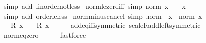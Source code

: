 \begin{isabellebody}
%
\isatagproof
{}\isamarkupfalse%
\ {\isacharparenleft}{\kern0pt}simp\ add{\isacharcolon}{\kern0pt}\ linorder{\isacharunderscore}{\kern0pt}not{\isacharunderscore}{\kern0pt}less{\isacharparenright}{\kern0pt}%
\endisatagproof
{\isafoldproof}%
%
\isadelimproof
\isanewline
%
\endisadelimproof
\isanewline
{}\isamarkupfalse%
\ norm{\isacharunderscore}{\kern0pt}le{\isacharunderscore}{\kern0pt}zero{\isacharunderscore}{\kern0pt}iff\ {\isacharbrackleft}{\kern0pt}simp{\isacharbrackright}{\kern0pt}{\isacharcolon}{\kern0pt}\ {\isachardoublequoteopen}norm\ x\ {\isasymle}\ {}\ {\isasymlongleftrightarrow}\ x\ {\isacharequal}{\kern0pt}\ {}{\isachardoublequoteclose}\isanewline
%
\isadelimproof
\ \ %
\endisadelimproof
%
\isatagproof
{}\isamarkupfalse%
\ {\isacharparenleft}{\kern0pt}simp\ add{\isacharcolon}{\kern0pt}\ order{\isacharunderscore}{\kern0pt}le{\isacharunderscore}{\kern0pt}less{\isacharparenright}{\kern0pt}%
\endisatagproof
{\isafoldproof}%
%
\isadelimproof
\isanewline
%
\endisadelimproof
\isanewline
{}\isamarkupfalse%
\ norm{\isacharunderscore}{\kern0pt}minus{\isacharunderscore}{\kern0pt}cancel\ {\isacharbrackleft}{\kern0pt}simp{\isacharbrackright}{\kern0pt}{\isacharcolon}{\kern0pt}\ {\isachardoublequoteopen}norm\ {\isacharparenleft}{\kern0pt}{\isacharminus}{\kern0pt}\ x{\isacharparenright}{\kern0pt}\ {\isacharequal}{\kern0pt}\ norm\ x{\isachardoublequoteclose}\isanewline
%
\isadelimproof
%
\endisadelimproof
%
\isatagproof
{}\isamarkupfalse%
\ {\isacharminus}{\kern0pt}\isanewline
\ \ \isamarkupfalse%
\ {\isachardoublequoteopen}{\isacharminus}{\kern0pt}\ {}\ {\isacharasterisk}{\kern0pt}\isactrlsub R\ x\ {\isacharequal}{\kern0pt}\ {\isacharminus}{\kern0pt}\ {\isacharparenleft}{\kern0pt}{}\ {\isacharasterisk}{\kern0pt}\isactrlsub R\ x{\isacharparenright}{\kern0pt}{\isachardoublequoteclose}\isanewline
\ \ \ \ \isamarkupfalse%
\ add{\isacharunderscore}{\kern0pt}eq{\isacharunderscore}{\kern0pt}{}{\isacharunderscore}{\kern0pt}iff{}{\isacharbrackleft}{\kern0pt}symmetric{\isacharbrackright}{\kern0pt}\ scaleR{\isacharunderscore}{\kern0pt}add{\isacharunderscore}{\kern0pt}left{\isacharbrackleft}{\kern0pt}symmetric{\isacharbrackright}{\kern0pt}\isanewline
\ \ \ \ \isamarkupfalse%
\ norm{\isacharunderscore}{\kern0pt}eq{\isacharunderscore}{\kern0pt}zero\isanewline
\ \ \ \ \isamarkupfalse%
\ fastforce\isanewline
\ \ \isamarkupfalse%
\ \isamarkupfalse%

\end{isabellebody}
